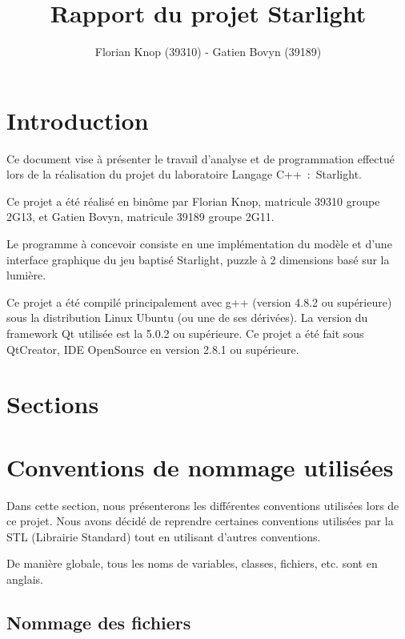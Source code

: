 \documentclass[]{article}
\title{Rapport du projet Starlight}
\author{Florian Knop (39310) - Gatien Bovyn (39189)}
\begin{document}
\lstset{language=C++}  
\maketitle

\newpage

\tableofcontents

\newpage

\section{Introduction}


Ce document vise à présenter le travail d’analyse et de programmation effectué
lors de la réalisation du projet du laboratoire Langage C++~:~Starlight.

Ce projet a été réalisé en binôme par Florian Knop, matricule 39310 groupe 2G13,
et Gatien Bovyn, matricule 39189 groupe 2G11.

Le programme à concevoir consiste en une implémentation du modèle et d’une interface
graphique du jeu baptisé Starlight, puzzle à 2 dimensions basé sur la lumière.

Ce projet a été compilé principalement avec g++
(version 4.8.2 ou supérieure)
sous la distribution Linux Ubuntu (ou une de ses dérivées).
La version du framework Qt utilisée est la 5.0.2 ou supérieure.
Ce projet a été fait sous QtCreator, IDE OpenSource en version 2.8.1 ou
supérieure.

\section{Sections}

\section{Conventions de nommage utilisées}

Dans cette section, nous présenterons les différentes conventions 
utilisées lors de ce projet. Nous avons décidé de reprendre certaines
conventions utilisées par la STL (Librairie Standard)
tout en utilisant d'autres conventions.

De manière globale, tous les noms de variables, classes, fichiers, etc.
sont en anglais.

\subsection{Nommage des fichiers}
\end{document}
